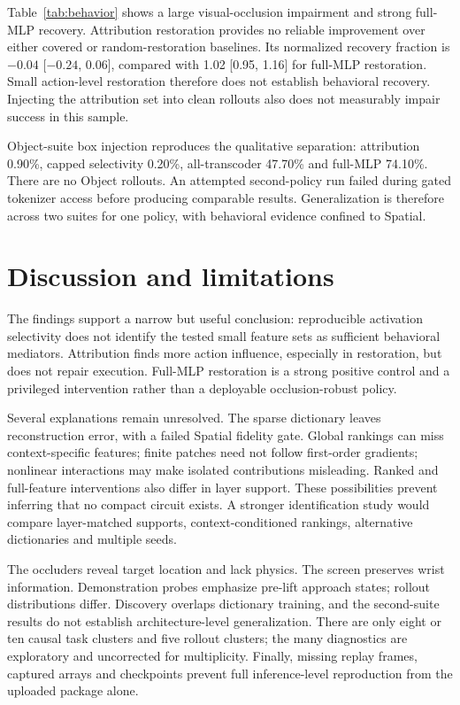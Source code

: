 \documentclass{article}
\begin{document}
Table~\ref{tab:behavior} shows a large visual-occlusion impairment and strong full-MLP recovery. Attribution restoration provides no reliable improvement over either covered or random-restoration baselines. Its normalized recovery fraction is $-0.04$ [$-0.24$, 0.06], compared with 1.02 [0.95, 1.16] for full-MLP restoration. Small action-level restoration therefore does not establish behavioral recovery. Injecting the attribution set into clean rollouts also does not measurably impair success in this sample.

Object-suite box injection reproduces the qualitative separation: attribution 0.90\%, capped selectivity 0.20\%, all-transcoder 47.70\% and full-MLP 74.10\%. There are no Object rollouts. An attempted second-policy run failed during gated tokenizer access before producing comparable results. Generalization is therefore across two suites for one policy, with behavioral evidence confined to Spatial.

\section{Discussion and limitations}
The findings support a narrow but useful conclusion: reproducible activation selectivity does not identify the tested small feature sets as sufficient behavioral mediators. Attribution finds more action influence, especially in restoration, but does not repair execution. Full-MLP restoration is a strong positive control and a privileged intervention rather than a deployable occlusion-robust policy.

Several explanations remain unresolved. The sparse dictionary leaves reconstruction error, with a failed Spatial fidelity gate. Global rankings can miss context-specific features; finite patches need not follow first-order gradients; nonlinear interactions may make isolated contributions misleading. Ranked and full-feature interventions also differ in layer support. These possibilities prevent inferring that no compact circuit exists. A stronger identification study would compare layer-matched supports, context-conditioned rankings, alternative dictionaries and multiple seeds.

The occluders reveal target location and lack physics. The screen preserves wrist information. Demonstration probes emphasize pre-lift approach states; rollout distributions differ. Discovery overlaps dictionary training, and the second-suite results do not establish architecture-level generalization. There are only eight or ten causal task clusters and five rollout clusters; the many diagnostics are exploratory and uncorrected for multiplicity. Finally, missing replay frames, captured arrays and checkpoints prevent full inference-level reproduction from the uploaded package alone.
\end{document}
